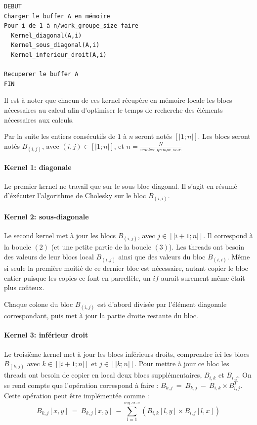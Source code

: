 \documentclass[paper=a4, fontsize=11pt]{scrartcl} %
\numberwithin{equation}{section} %
\numberwithin{figure}{section} %
\numberwithin{table}{section} %
\begin{document}
\begin{verbatim}
DEBUT
Charger le buffer A en mémoire
Pour i de 1 à n/work_groupe_size faire
  Kernel_diagonal(A,i)
  Kernel_sous_diagonal(A,i)
  Kernel_inferieur_droit(A,i)

Recuperer le buffer A
FIN
\end{verbatim}

Il est à noter que chacun de ces kernel récupère en mémoire locale les
blocs nécessaires au calcul afin d'optimiser le temps de recherche des
éléments nécessaires aux calculs.

Par la suite les entiers consécutifs de $1$ à $n$ seront notés
$[|1;n|]$. Les blocs seront notés $B_{(i,j)}$, avec $(i,j)\in[|1;n|]$,
et $n = \frac{N}{worker\_groupe\_size}$


\paragraph{Kernel 1: diagonale}

Le premier kernel ne travail que sur le sous bloc diagonal. Il s'agit
en résumé d'éxécuter l'algorithme de Cholesky sur le bloc $B_{(i,i)}$.

\paragraph{Kernel 2: sous-diagonale} 

Le second kernel met à jour les blocs $B_{(i,j)}$, avec
$j\in[|i+1;n|]$. Il correspond à la boucle $(2)$ (et une petite partie
de la boucle $(3)$).  Les threads ont besoin des valeurs de leur blocs
local $B_{(i,j)}$ ainsi que des valeurs du bloc $B_{(i,i)}$. Même si
seule la première moitié de ce dernier bloc est nécessaire, autant
copier le bloc entier puisque les copies ce font en parrellèle, un
$if$ aurait surement même était plus coûteux.

Chaque colone du bloc $B_{(i,j)}$ est d'abord divisée par l'élément
diagonale correspondant, puis met à jour la partie droite restante du
bloc.

\paragraph{Kernel 3: inférieur droit} 

Le troisième kernel met à jour les blocs inférieurs droits, comprendre
ici les blocs $B_{(k,j)}$ avec $k\in[|i+1;n|]$ et $j\in[|k;n|]$. Pour
mettre à jour ce bloc les threads ont besoin de copier en local deux
blocs supplémentaires, $B_{i,k}$ et $B_{i,j}$. On se rend compte que
l'opération correspond à faire : $B_{k,j}\ =\ B_{k,j}\ -\ B_{i,k}
\times B_{i,j}^T$. Cette opération peut être implémentée comme :
$$B_{k,j}[x,y]\ =\ B_{k,j}[x,y]\ - \sum_{l=1}^{wg\_size}(B_{i,k}[l,y]
\times B_{i,j}[l,x])$$
\end{document}
